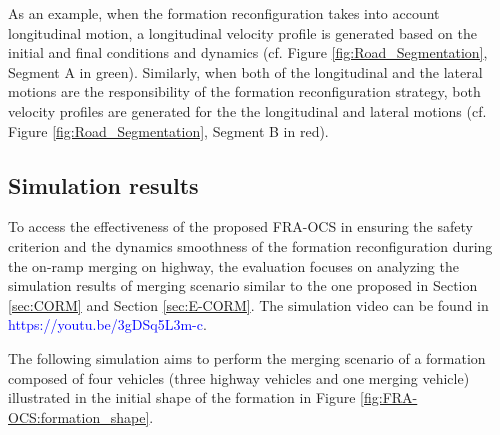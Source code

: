 \begin{enumerate}
As an example, when the formation reconfiguration takes into account longitudinal motion, a longitudinal velocity profile is generated based on the initial and final conditions and dynamics (cf. Figure \ref{fig:Road_Segmentation}, Segment A in green). Similarly, when both of the longitudinal and the lateral motions are the responsibility of the formation reconfiguration strategy, both velocity profiles are generated for the the longitudinal and lateral motions (cf. Figure \ref{fig:Road_Segmentation}, Segment B in red). 

\end{enumerate}




\subsection{Simulation results}\label{sec:Simulation_FRA-OCS}
To access the effectiveness of the proposed FRA-OCS in ensuring the safety criterion and the dynamics smoothness of the formation reconfiguration during the on-ramp merging on highway, the evaluation focuses on analyzing the simulation results of merging scenario similar to the one proposed in Section \ref{sec:CORM} and Section \ref{sec:E-CORM}. The simulation video can be found in \textcolor{blue}{https://youtu.be/3gDSq5L3m-c}. 





The following simulation aims to perform the merging scenario of a formation composed of four vehicles (three highway vehicles and one merging vehicle) illustrated in the initial shape of the formation in Figure \ref{fig:FRA-OCS:formation_shape}. 

